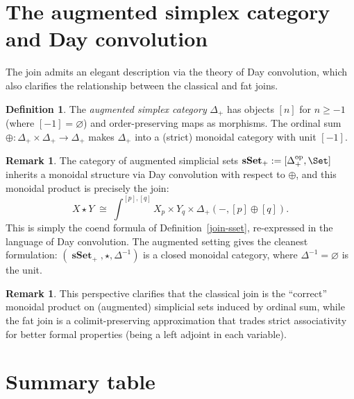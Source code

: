 \documentclass{article}
\theoremstyle{definition}
\newtheorem{definition}[proposition]{Definition}
\newtheorem{remark}[proposition]{Remark}
\DeclareMathOperator{\sSet}{\mathbf{sSet}}
\begin{document}
\section{The augmented simplex category and Day convolution}

The join admits an elegant description via the theory of Day convolution, which also clarifies the relationship between the classical and fat joins.

\begin{definition}\label{aug-simplex}
	The \emph{augmented simplex category} $\Delta_+$ has objects $[n]$ for $n \geq -1$ (where $[-1] = \varnothing$) and order-preserving maps as morphisms. The ordinal sum $\oplus : \Delta_+ \times \Delta_+ \to \Delta_+$ makes $\Delta_+$ into a (strict) monoidal category with unit $[-1]$.
\end{definition}

\begin{remark}
	The category of augmented simplicial sets $\sSet_+ := [\Delta_+^{\mathrm{op}}, \Set]$ inherits a monoidal structure via Day convolution with respect to $\oplus$, and this monoidal product is precisely the join:
	\[X \star Y \;\cong\; \int^{[p],[q]} X_p \times Y_q \times \Delta_+(-,[p] \oplus [q]).\]
	This is simply the coend formula of Definition~\ref{join-sset}, re-expressed in the language of Day convolution. The augmented setting gives the cleanest formulation: $(\sSet_+, \star, \Delta^{-1})$ is a closed monoidal category, where $\Delta^{-1} = \varnothing$ is the unit.
\end{remark}

\begin{remark}
	This perspective clarifies that the classical join is the ``correct'' monoidal product on (augmented) simplicial sets induced by ordinal sum, while the fat join is a colimit-preserving approximation that trades strict associativity for better formal properties (being a left adjoint in each variable).
\end{remark}

\section{Summary table}
\end{document}
